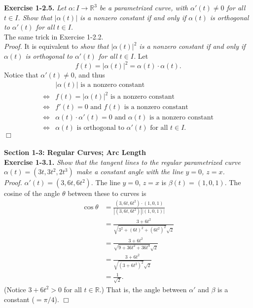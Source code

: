 \documentclass{article}
\begin{document}
\textbf{Exercise 1-2.5.}
\emph{Let $\alpha: I \to \mathbb{R}^3$ be a parametrized curve,
with $\alpha'(t) \neq 0$ for all $t \in I$.
Show that $|\alpha(t)|$ is a nonzero constant
if and only if
$\alpha(t)$ is orthogonal to $\alpha'(t)$ for all $t \in I$.} \\

The same trick in Exercise 1-2.2. \\

\emph{Proof.}
It is equivalent to
\emph{show that $|\alpha(t)|^2$ is a nonzero constant
if and only if
$\alpha(t)$ is orthogonal to $\alpha'(t)$ for all $t \in I$.}
Let $$f(t) = |\alpha(t)|^2 = \alpha(t) \cdot \alpha(t).$$
Notice that $\alpha'(t) \neq 0$, and thus
\begin{align*}
&|\alpha(t)| \text{ is a nonzero constant} \\
\Longleftrightarrow&
f(t) = |\alpha(t)|^2 \text{ is a nonzero constant} \\
\Longleftrightarrow&
f'(t) = 0 \text{ and } f(t) \text{ is a nonzero constant} \\
\Longleftrightarrow&
\alpha(t) \cdot \alpha'(t) = 0 \text{ and } \alpha(t) \text{ is a nonzero constant} \\
\Longleftrightarrow&
\alpha(t) \text{ is orthogonal to } \alpha'(t) \text{ for all } t \in I.
\end{align*}
$\Box$ \\\\









\textbf{\large Section 1-3: Regular Curves; Arc Length} \\



\textbf{Exercise 1-3.1.}
\emph{Show that the tangent lines to the regular parametrized curve
$\alpha(t) = (3t, 3t^2, 2t^3)$ make a constant angle with the line $y = 0$, $z = x$. } \\

\emph{Proof.}
$\alpha'(t) = (3, 6t, 6t^2)$.
The line $y = 0$, $z = x$ is $\beta(t) = (1,0,1)$.
The cosine of the angle $\theta$ between these to curves is
\begin{align*}
\cos \theta
&= \frac{(3, 6t, 6t^2) \cdot (1,0,1)}{|(3, 6t, 6t^2)||(1,0,1)|} \\
&= \frac{3+6t^2}{\sqrt{3^2 + (6t)^2 + (6t^2)^2}\sqrt{2}} \\
&= \frac{3+6t^2}{\sqrt{9 + 36 t^2 + 36t^4}\sqrt{2}} \\
&= \frac{3+6t^2}{\sqrt{(3 + 6t^2)^2}\sqrt{2}} \\
&= \frac{1}{\sqrt{2}}.
\end{align*}
(Notice $3 + 6t^2 > 0$ for all $t \in \mathbb{R}$.)
That is, the angle between $\alpha'$ and $\beta$ is a constant ($= \pi/4$).
$\Box$ \\\\
\end{document}
